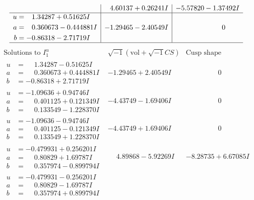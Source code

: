 \documentclass[1p]{elsarticle_modified}
\theoremstyle{definition}
\newcommand{\I}{\sqrt{-1}}
\begin{document}
$$\begin{array}{c|c|c}
 & \phantom{-}4.60137 + 0.26241 I & -5.57820 - 1.37492 I \\ \hline\begin{aligned}
u &= \phantom{-}1.34287 + 0.51625 I \\
a &= \phantom{-}0.360673 - 0.444881 I \\
b &= -0.86318 - 2.71719 I\end{aligned}
 & -1.29465 - 2.40549 I & \phantom{-0.000000 } 0\\
 \hline 
 \end{array}$$\newpage$$\begin{array}{c|c|c}  
\text{Solutions to }I^u_{1}& \I (\text{vol} + \sqrt{-1}CS) & \text{Cusp shape}\\
 \hline 
\begin{aligned}
u &= \phantom{-}1.34287 - 0.51625 I \\
a &= \phantom{-}0.360673 + 0.444881 I \\
b &= -0.86318 + 2.71719 I\end{aligned}
 & -1.29465 + 2.40549 I & \phantom{-0.000000 } 0 \\ \hline\begin{aligned}
u &= -1.09636 + 0.94746 I \\
a &= \phantom{-}0.401125 + 0.121349 I \\
b &= \phantom{-}0.133549 - 1.228370 I\end{aligned}
 & -4.43749 - 1.69406 I & \phantom{-0.000000 } 0 \\ \hline\begin{aligned}
u &= -1.09636 - 0.94746 I \\
a &= \phantom{-}0.401125 - 0.121349 I \\
b &= \phantom{-}0.133549 + 1.228370 I\end{aligned}
 & -4.43749 + 1.69406 I & \phantom{-0.000000 } 0 \\ \hline\begin{aligned}
u &= -0.479931 + 0.256201 I \\
a &= \phantom{-}0.80829 + 1.69787 I \\
b &= \phantom{-}0.357974 - 0.899794 I\end{aligned}
 & \phantom{-}4.89868 - 5.92269 I & -8.28735 + 6.67085 I \\ \hline\begin{aligned}
u &= -0.479931 - 0.256201 I \\
a &= \phantom{-}0.80829 - 1.69787 I \\
b &= \phantom{-}0.357974 + 0.899794 I\end{aligned}

\end{array}$$
\end{document}

